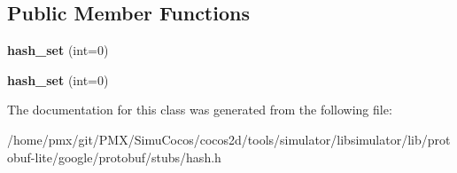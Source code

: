 \subsection*{Public Member Functions}
\begin{DoxyCompactItemize}
\item 
\mbox{\label{classgoogle_1_1protobuf_1_1hash__set_a88786cb894ffe52a33e228289634354f}} 
{\bfseries hash\+\_\+set} (int=0)
\item 
\mbox{\label{classgoogle_1_1protobuf_1_1hash__set_a88786cb894ffe52a33e228289634354f}} 
{\bfseries hash\+\_\+set} (int=0)
\end{DoxyCompactItemize}


The documentation for this class was generated from the following file\+:\begin{DoxyCompactItemize}
\item 
/home/pmx/git/\+P\+M\+X/\+Simu\+Cocos/cocos2d/tools/simulator/libsimulator/lib/protobuf-\/lite/google/protobuf/stubs/hash.\+h\end{DoxyCompactItemize}
